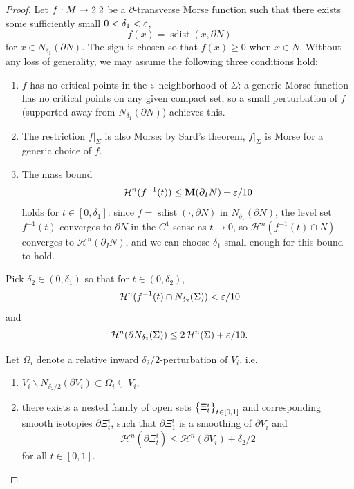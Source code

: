 \begin{proof}
        Let $f: M \to 2.2$ be a $\partial$-transverse Morse function such that there exists some sufficiently small $0 < \delta_1 < \varepsilon$,
        \begin{equation*}
            f(x) = \operatorname{sdist}(x, \partial N)
        \end{equation*}
        for $x \in N_{\delta_1}(\partial N)$. The sign is chosen so that $f(x) \geq 0$ when $x \in N$. Without any loss of generality, we may assume the following three conditions hold:
        \begin{enumerate}
            \item[(i)] $f$ has no critical points in the $\varepsilon$-neighborhood of $\Sigma$: a generic Morse function has no critical points on any given compact set, so a small perturbation of $f$ (supported away from $N_{\delta_1}(\partial N)$) achieves this.
            \item[(ii)] The restriction $f|_\Sigma$ is also Morse: by Sard's theorem, $f|_\Sigma$ is Morse for a generic choice of $f$.
            \item[(iii)] The mass bound
        \begin{equation*}
            \mathcal{H}^n(f^{-1}(t)) \leq \mathbf{M}(\partial_I N) + \varepsilon/10
        \end{equation*}
        holds for $t \in [0, \delta_1]$: since $f = \operatorname{sdist}(\cdot, \partial N)$ in $N_{\delta_1}(\partial N)$, the level set $f^{-1}(t)$ converges to $\partial N$ in the $C^1$ sense as $t \to 0$, so $\mathcal{H}^n(f^{-1}(t) \cap N)$ converges to $\mathcal{H}^n(\partial_I N)$, and we can choose $\delta_1$ small enough for this bound to hold.
        \end{enumerate} Pick $\delta_2 \in (0, \delta_1)$ so that for $t \in (0, \delta_2)$,
        \begin{equation*}
            \mathcal{H}^n(f^{-1}(t)\cap N_{\delta_2}(\Sigma)) < \varepsilon/10
        \end{equation*}
        and
        \begin{equation*}
            \mathcal{H}^n(\partial N_{\delta_2}(\Sigma)) \leq 2\,\mathcal{H}^n(\Sigma) + \varepsilon/10.
        \end{equation*}

        Let $\Omega_i$ denote a relative inward $\delta_2/2$-perturbation of $V_i$, i.e.
        \begin{enumerate}
            \item[(a)] $V_i\backslash N_{\delta_2/2}(\partial V_i) \subset \Omega_i \subsetneq V_i$;
            \item[(b)] there exists a nested family of open sets $\left\{\Xi_t^i\right\}_{t \in [0, 1]}$ and corresponding smooth isotopies $\partial\Xi_t^i$, such that $\partial\Xi_1^i$ is a smoothing of $\partial V_i$ and
            \begin{equation*}
                \mathcal{H}^n(\partial\Xi_t^i) \leq \mathcal{H}^n(\partial V_i) + \delta_2/2
            \end{equation*}
            for all $t \in [0, 1]$.
        \end{enumerate}


\end{proof}
